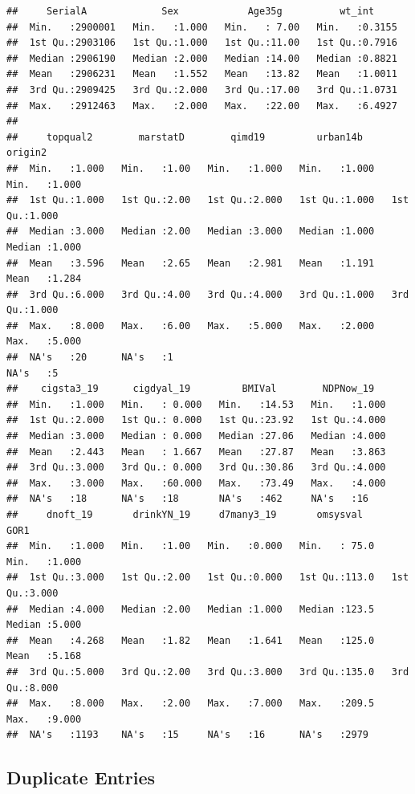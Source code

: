 \documentclass[
  11pt,
]{article}
\begin{document}
\begin{verbatim}
##     SerialA             Sex            Age35g          wt_int      
##  Min.   :2900001   Min.   :1.000   Min.   : 7.00   Min.   :0.3155  
##  1st Qu.:2903106   1st Qu.:1.000   1st Qu.:11.00   1st Qu.:0.7916  
##  Median :2906190   Median :2.000   Median :14.00   Median :0.8821  
##  Mean   :2906231   Mean   :1.552   Mean   :13.82   Mean   :1.0011  
##  3rd Qu.:2909425   3rd Qu.:2.000   3rd Qu.:17.00   3rd Qu.:1.0731  
##  Max.   :2912463   Max.   :2.000   Max.   :22.00   Max.   :6.4927  
##                                                                    
##     topqual2        marstatD        qimd19         urban14b        origin2     
##  Min.   :1.000   Min.   :1.00   Min.   :1.000   Min.   :1.000   Min.   :1.000  
##  1st Qu.:1.000   1st Qu.:2.00   1st Qu.:2.000   1st Qu.:1.000   1st Qu.:1.000  
##  Median :3.000   Median :2.00   Median :3.000   Median :1.000   Median :1.000  
##  Mean   :3.596   Mean   :2.65   Mean   :2.981   Mean   :1.191   Mean   :1.284  
##  3rd Qu.:6.000   3rd Qu.:4.00   3rd Qu.:4.000   3rd Qu.:1.000   3rd Qu.:1.000  
##  Max.   :8.000   Max.   :6.00   Max.   :5.000   Max.   :2.000   Max.   :5.000  
##  NA's   :20      NA's   :1                                      NA's   :5      
##    cigsta3_19      cigdyal_19         BMIVal        NDPNow_19    
##  Min.   :1.000   Min.   : 0.000   Min.   :14.53   Min.   :1.000  
##  1st Qu.:2.000   1st Qu.: 0.000   1st Qu.:23.92   1st Qu.:4.000  
##  Median :3.000   Median : 0.000   Median :27.06   Median :4.000  
##  Mean   :2.443   Mean   : 1.667   Mean   :27.87   Mean   :3.863  
##  3rd Qu.:3.000   3rd Qu.: 0.000   3rd Qu.:30.86   3rd Qu.:4.000  
##  Max.   :3.000   Max.   :60.000   Max.   :73.49   Max.   :4.000  
##  NA's   :18      NA's   :18       NA's   :462     NA's   :16     
##     dnoft_19       drinkYN_19     d7many3_19       omsysval          GOR1      
##  Min.   :1.000   Min.   :1.00   Min.   :0.000   Min.   : 75.0   Min.   :1.000  
##  1st Qu.:3.000   1st Qu.:2.00   1st Qu.:0.000   1st Qu.:113.0   1st Qu.:3.000  
##  Median :4.000   Median :2.00   Median :1.000   Median :123.5   Median :5.000  
##  Mean   :4.268   Mean   :1.82   Mean   :1.641   Mean   :125.0   Mean   :5.168  
##  3rd Qu.:5.000   3rd Qu.:2.00   3rd Qu.:3.000   3rd Qu.:135.0   3rd Qu.:8.000  
##  Max.   :8.000   Max.   :2.00   Max.   :7.000   Max.   :209.5   Max.   :9.000  
##  NA's   :1193    NA's   :15     NA's   :16      NA's   :2979
\end{verbatim}

\hypertarget{duplicate-entries}{%
\subsection{Duplicate Entries}\label{duplicate-entries}}
\end{document}
